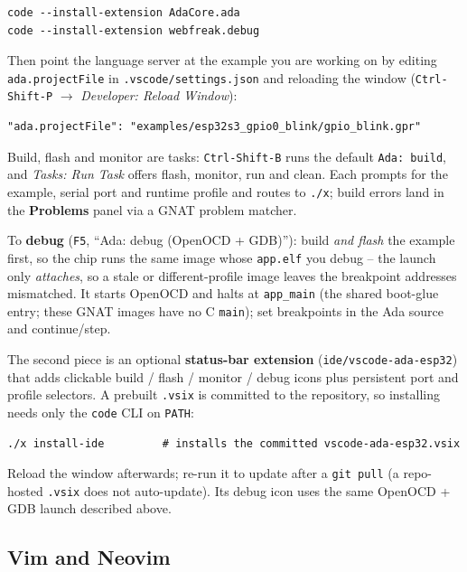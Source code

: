 \begin{lstlisting}[style=sh]
code --install-extension AdaCore.ada
code --install-extension webfreak.debug
\end{lstlisting}

Then point the language server at the example you are working on by editing
\texttt{ada.projectFile} in \texttt{.vscode/settings.json} and reloading the
window (\texttt{Ctrl-Shift-P} $\rightarrow$ \emph{Developer: Reload Window}):

\begin{lstlisting}[style=sh]
"ada.projectFile": "examples/esp32s3_gpio0_blink/gpio_blink.gpr"
\end{lstlisting}

Build, flash and monitor are tasks: \texttt{Ctrl-Shift-B} runs the default
\texttt{Ada: build}, and \emph{Tasks: Run Task} offers flash, monitor, run and
clean. Each prompts for the example, serial port and runtime profile and routes
to \texttt{./x}; build errors land in the \textbf{Problems} panel via a GNAT
problem matcher.

To \textbf{debug} (\texttt{F5}, ``Ada: debug (OpenOCD + GDB)''): build \emph{and
flash} the example first, so the chip runs the same image whose \texttt{app.elf}
you debug -- the launch only \emph{attaches}, so a stale or different-profile
image leaves the breakpoint addresses mismatched. It starts OpenOCD and halts at
\texttt{app\_main} (the shared boot-glue entry; these GNAT images have no C
\texttt{main}); set breakpoints in the Ada source and continue/step.

The second piece is an optional \textbf{status-bar extension}
(\texttt{ide/vscode-ada-esp32}) that adds clickable build / flash / monitor /
debug icons plus persistent port and profile selectors. A prebuilt
\texttt{.vsix} is committed to the repository, so installing needs only the
\texttt{code} CLI on \texttt{PATH}:

\begin{lstlisting}[style=sh]
./x install-ide         # installs the committed vscode-ada-esp32.vsix
\end{lstlisting}

Reload the window afterwards; re-run it to update after a \texttt{git pull} (a
repo-hosted \texttt{.vsix} does not auto-update). Its debug icon uses the same
OpenOCD + GDB launch described above.

\subsection{Vim and Neovim}

